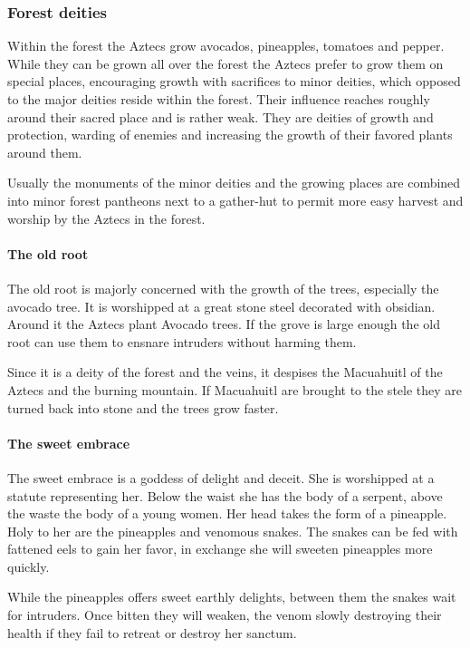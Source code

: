 \documentclass[a4paper]{book}
\begin{document}
\subsubsection{Forest deities}
Within the forest the \gls{Aztecs} grow avocados, pineapples, tomatoes and
pepper. While they can be grown all over the forest the \gls{Aztecs} prefer to
grow them on special places, encouraging growth with sacrifices to minor
deities, which opposed to the major deities reside within the forest. Their
influence reaches roughly around their sacred place and is rather weak. They
are deities of growth and protection, warding of enemies and increasing the
growth of their favored plants around them.

Usually the monuments of the minor deities and the growing places are combined
into minor forest pantheons next to a gather-hut to permit more easy harvest
and worship by the \gls{Aztecs} in the forest.

\paragraph{The old root}
The old root is majorly concerned with the growth of the trees, especially the
avocado tree. It is worshipped at a great stone steel decorated with obsidian.
Around it the \gls{Aztecs} plant Avocado trees. If the grove is large enough
the old root can use them to ensnare intruders without harming them.

Since it is a deity of the forest and the veins, it despises the Macuahuitl of
the \gls{Aztecs} and the burning mountain. If Macuahuitl are brought to the
stele they are turned back into stone and the trees grow faster.

\paragraph{The sweet embrace}
The sweet embrace is a goddess of delight and deceit. She is worshipped at a
statute representing her. Below the waist she has the body of a serpent, above
the waste the body of a young women. Her head takes the form of a pineapple.
Holy to her are the pineapples and venomous snakes. The snakes can be fed with
fattened eels to gain her favor, in exchange she will sweeten pineapples more
quickly.

While the pineapples offers sweet earthly delights, between them the snakes
wait for intruders. Once bitten they will weaken, the venom slowly destroying
their health if they fail to retreat or destroy her sanctum.
\end{document}
